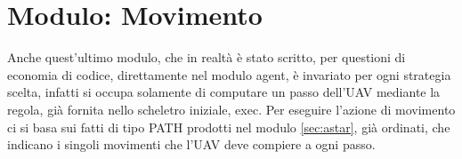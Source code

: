 \section{Modulo: Movimento} \label{sec:movimento}
Anche quest'ultimo modulo, che in realtà è stato scritto, per questioni di economia di codice, direttamente nel modulo agent, è invariato per ogni strategia scelta, infatti si occupa solamente di computare un passo dell'UAV mediante la regola, già fornita nello scheletro iniziale, exec. Per eseguire l'azione di movimento ci si basa sui fatti di tipo PATH prodotti nel modulo \ref{sec:astar}, già ordinati, che indicano i singoli movimenti che l'UAV deve compiere a ogni passo.
